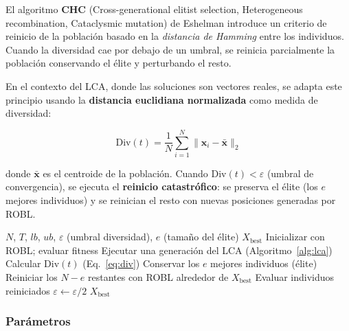 El algoritmo \textbf{CHC} (Cross-generational elitist selection, Heterogeneous recombination,
Cataclysmic mutation) de Eshelman \cite{eshelman1991chc} introduce un criterio de reinicio
de la población basado en la \emph{distancia de Hamming} entre los individuos. Cuando la
diversidad cae por debajo de un umbral, se reinicia parcialmente la población conservando
el élite y perturbando el resto.

En el contexto del LCA, donde las soluciones son vectores reales, se adapta este principio
usando la \textbf{distancia euclidiana normalizada} como medida de diversidad:

\begin{equation}
  \text{Div}(t) = \frac{1}{N} \sum_{i=1}^{N} \|\mathbf{x}_i - \bar{\mathbf{x}}\|_2
  \label{eq:div}
\end{equation}

donde $\bar{\mathbf{x}}$ es el centroide de la población. Cuando $\text{Div}(t) < \varepsilon$
(umbral de convergencia), se ejecuta el \textbf{reinicio catastrófico}: se preserva el
élite (los $e$ mejores individuos) y se reinician el resto con nuevas posiciones generadas
por ROBL.

\begin{algorithm}[H]
\caption{LCA-CHC: LCA con reinicio adaptativo de diversidad}
\label{alg:lcachc}
\begin{algorithmic}[1]
\Require $N$, $T$, $lb$, $ub$, $\varepsilon$ (umbral diversidad), $e$ (tamaño del élite)
\Ensure $X_{\text{best}}$
\State Inicializar con ROBL; evaluar fitness
  \State Ejecutar una generación del LCA (Algoritmo~\ref{alg:lca})
  \State Calcular $\text{Div}(t)$ (Eq.~\ref{eq:div})
   
    \State Conservar los $e$ mejores individuos (élite)
    \State Reiniciar los $N-e$ restantes con ROBL alrededor de $X_{\text{best}}$
    \State Evaluar individuos reiniciados
    \State $\varepsilon \leftarrow \varepsilon / 2$ 
  \EndIf
\EndFor
\State \Return $X_{\text{best}}$
\end{algorithmic}
\end{algorithm}

\subsubsection{Parámetros}

